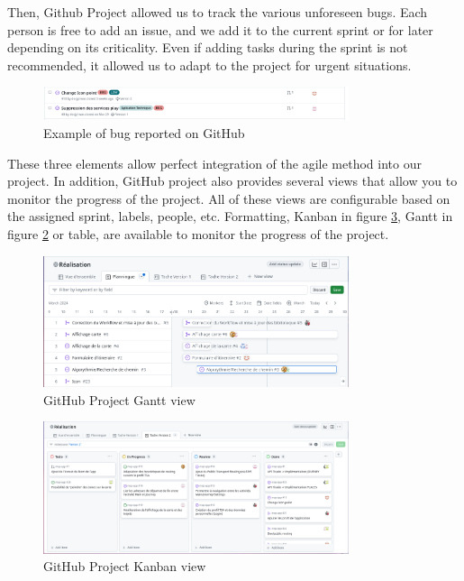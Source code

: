 \newpage

Then, Github Project allowed us to track the various unforeseen bugs.
Each person is free to add an issue, and we add it to the current sprint or for later depending on its criticality.
Even if adding tasks during the sprint is not recommended, it allowed us to adapt to the project for urgent situations.

\begin{figure}[h]
    \centering
    \includegraphics[width=0.8\textwidth]{img/GitHubBug}
    \caption{Example of bug reported on GitHub}
    \label{fig:GitHubBug}
\end{figure}

These three elements allow perfect integration of the agile method into our project.
In addition, GitHub project also provides several views that allow you to monitor the progress of the project.
All of these views are configurable based on the assigned sprint, labels, people, etc.
Formatting, Kanban in figure \ref{fig:GitHubKanban}, Gantt in figure \ref{fig:GitHubGant} or table,
are available to monitor the progress of the project.


\begin{figure}[h]
    \centering
    \includegraphics[width=0.8\textwidth]{img/GitHubGant}
    \caption{GitHub Project Gantt view}
    \label{fig:GitHubGant}
\end{figure}

\begin{figure}[h]
    \centering
    \includegraphics[width=0.8\textwidth]{img/GitHubKanban}
    \caption{GitHub Project Kanban view}
    \label{fig:GitHubKanban}
\end{figure}

